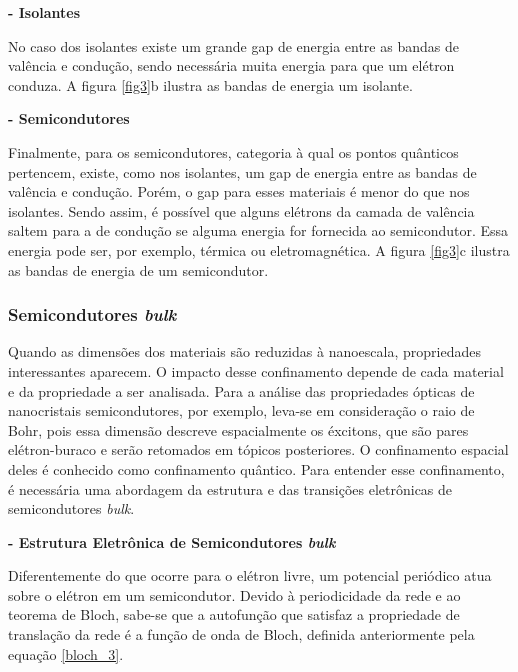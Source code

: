 	\par \textbf{- Isolantes}

		\par No caso dos isolantes existe um grande gap de energia entre as bandas de valência e condução, sendo necessária muita energia para que um elétron conduza. A figura \ref{fig3}b ilustra as bandas de energia um isolante.

	\par \textbf{- Semicondutores}
	
		\par Finalmente, para os semicondutores, categoria à qual os pontos quânticos pertencem, existe, como nos isolantes, um gap de energia entre as bandas de valência e condução. Porém, o gap para esses materiais é menor do que nos isolantes. Sendo assim, é possível que alguns elétrons da camada de valência saltem para a de condução se alguma energia for fornecida ao semicondutor. Essa energia pode ser, por exemplo, térmica ou eletromagnética. A figura \ref{fig3}c ilustra as bandas de energia de um semicondutor.

\subsubsection{Semicondutores \textit{bulk}}

	\par Quando as dimensões dos materiais são reduzidas à nanoescala, propriedades interessantes aparecem. O impacto desse confinamento depende de cada material e da propriedade a ser analisada. Para a análise das propriedades ópticas de nanocristais semicondutores, por exemplo, leva-se em consideração o raio de Bohr, pois essa dimensão descreve espacialmente os éxcitons, que são pares elétron-buraco e serão retomados em tópicos posteriores. O confinamento espacial deles é conhecido como confinamento quântico. Para entender esse confinamento, é necessária uma abordagem da estrutura e das transições eletrônicas de semicondutores \textit{bulk}. 

	\par \textbf{- Estrutura Eletrônica de Semicondutores \textit{bulk}}

		\par Diferentemente do que ocorre para o elétron livre, um potencial periódico atua sobre o elétron em um semicondutor. Devido à periodicidade da rede e ao teorema de Bloch, sabe-se que a autofunção que satisfaz a propriedade de translação da rede é a função de onda de Bloch, definida anteriormente pela equação \eqref{bloch_3}.


